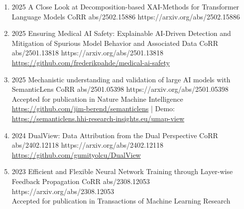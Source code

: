 {\begin{enumerate}
        \item {}
                        {2025}
                        {A Close Look at Decomposition-based XAI-Methods for Transformer Language Models}
                        {CoRR abs/2502.15886}
                        {https://arxiv.org/abs/2502.15886}

       
        \item {}
                        {2025}
                        {Ensuring Medical AI Safety: Explainable AI-Driven Detection and Mitigation of Spurious Model Behavior and Associated Data}
                        {CoRR abs/2501.13818}
                        {https://arxiv.org/abs/2501.13818}
                        {
                            \\\href{https://github.com/frederikpahde/medical-ai-safety}{https://github.com/frederikpahde/medical-ai-safety}
                        }

        \item {}
                        {2025}
                        {Mechanistic understanding and validation of large AI models with SemanticLens}
                        {CoRR abs/2501.05398}
                        {https://arxiv.org/abs/2501.05398}
                        {   
                            \\ Accepted for publication in Nature Machine Intelligence
                            \\\href{https://github.com/jim-berend/semanticlens}{https://github.com/jim-berend/semanticlens} | Demo: \href{https://semanticlens.hhi-research-insights.eu/umap-view}{https://semanticlens.hhi-research-insights.eu/umap-view}
                        }

        \item {}
                        {2024}
                        {DualView: Data Attribution from the Dual Perspective}
                        {CoRR abs/2402.12118}
                        {https://arxiv.org/abs/2402.12118}
                        {\\\href{https://github.com/gumityolcu/DualView}{https://github.com/gumityolcu/DualView}}

        \item {}
                        {2023}
                        {Efficient and Flexible Neural Network Training through Layer-wise Feedback Propagation}
                        {CoRR abs/2308.12053}
                        {https://arxiv.org/abs/2308.12053}
                        {
                        \\ Accepted for publication in Transactions of Machine Learning Research
                        }


\end{enumerate}}
